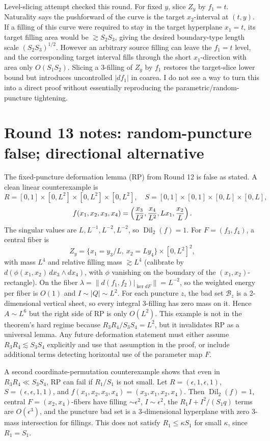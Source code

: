 \documentclass[12pt]{article}
\newcommand{\Dil}{\operatorname{Dil}}
\begin{document}
Level-slicing attempt checked this round.  For fixed \(y\), slice
\(Z_y\) by \(f_1=t\).  Naturality says the pushforward of the curve is the
target \(x_2\)-interval at \((t,y)\).  If a filling of this curve were required
to stay in the target hyperplane \(x_1=t\), its target filling area would be
\(\gtrsim S_2S_3\), giving the desired boundary-type length scale
\((S_2S_3)^{1/2}\).  However an arbitrary source filling can leave the
\(f_1=t\) level, and the corresponding target interval fills through the short
\(x_1\)-direction with area only \(O(S_1S_2)\).  Slicing a 3-filling of \(Z_y\)
by \(f_1\) restores the target-slice lower bound but introduces uncontrolled
\(|df_1|\) in coarea.  I do not see a way to turn this into a direct proof
without essentially reproducing the parametric/random-puncture tightening.




\section*{Round 13 notes: random-puncture false; directional alternative}

The fixed-puncture deformation lemma (RP) from Round 12 is false as stated.
A clean linear counterexample is
\[
R=[0,1]\times[0,L^2]\times[0,L^2]\times[0,L^2],\quad
S=[0,1]\times[0,1]\times[0,L]\times[0,L],
\]
\[
f(x_1,x_2,x_3,x_4)=
\left({x_3\over L^2},{x_4\over L^2},Lx_1,{x_2\over L}\right).
\]
The singular values are \(L,L^{-1},L^{-2},L^{-2}\), so \(\Dil_2(f)=1\).
For \(F=(f_3,f_4)\), a central fiber is
\[
Z_y=\{x_1=y_3/L,\ x_2=Ly_4\}\times[0,L^2]^2,
\]
with mass \(L^4\) and relative filling mass \(\gtrsim L^4\) (calibrate by
\(d(\phi(x_1,x_2)\,dx_3\wedge dx_4)\), with \(\phi\) vanishing on the boundary
of the \((x_1,x_2)\)-rectangle).  On the fiber
\(\lambda=\|d(f_1,f_2)|_{\ker dF}\|=L^{-2}\), so the weighted energy per fiber is
\(O(1)\) and \(I\sim |Q|\sim L^2\).  For each puncture \(z\), the bad set
\(\mathcal B_z\) is a 2-dimensional vertical sheet, so every integral 3-filling has
zero mass on it.  Hence \(A\sim L^6\) but the right side of RP is only \(O(L^2)\).
This example is not in the theorem's hard regime because \(R_3R_4/S_3S_4=L^2\),
but it invalidates RP as a universal lemma.  Any future deformation statement must
either assume \(R_3R_4\lesssim S_3S_4\) explicitly and use that assumption in the
proof, or include additional terms detecting horizontal use of the parameter map
\(F\).

A second coordinate-permutation counterexample shows that even in
\(R_3R_4\ll S_3S_4\), RP can fail if \(R_1/S_1\) is not small.  Let
\(R=(\epsilon,1,\epsilon,1)\), \(S=(\epsilon,\epsilon,1,1)\), and
\(f(x_1,x_2,x_3,x_4)=(x_3,x_1,x_2,x_4)\).  Then \(\Dil_2(f)=1\), central
\(F=(x_2,x_4)\)-fibers have filling \(\sim\epsilon^2\), \(I\sim\epsilon^2\),
the \(R_1I+I^2/(S_1q)\) terms are \(O(\epsilon^3)\), and the puncture bad set is
a 3-dimensional hyperplane with zero 3-mass intersection for fillings.  This does
not satisfy \(R_1\le\kappa S_1\) for small \(\kappa\), since \(R_1=S_1\).
\end{document}

